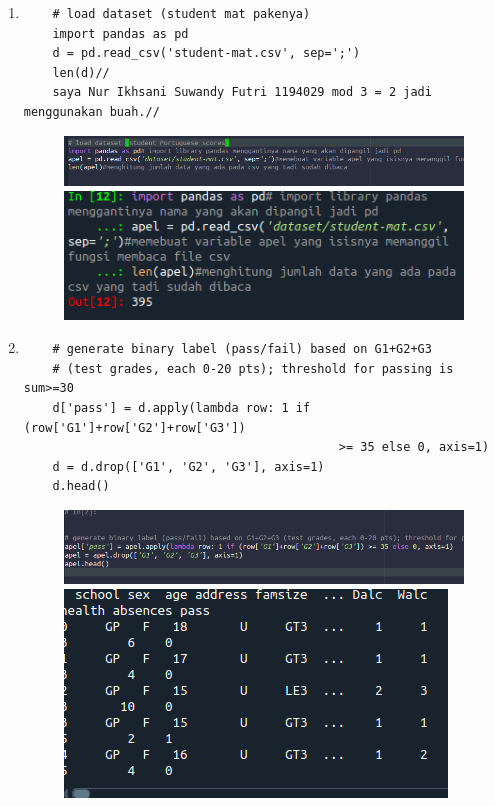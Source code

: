 \begin{enumerate}

\item
\begin{verbatim}
	# load dataset (student mat pakenya)
	import pandas as pd
	d = pd.read_csv('student-mat.csv', sep=';')
	len(d)//
	saya Nur Ikhsani Suwandy Futri 1194029 mod 3 = 2 jadi menggunakan buah.//
\end{verbatim}
\begin{figure}[!htbp]
		\centering
		\includegraphics[scale=0.4]{figures/chapter2/chapter1.1.PNG}
		\includegraphics[scale=0.5]{figures/chapter2/hasilchapter1.1.PNG}
	\end{figure}
\newpage
\item
\begin{verbatim}
	# generate binary label (pass/fail) based on G1+G2+G3 
	# (test grades, each 0-20 pts); threshold for passing is sum>=30
	d['pass'] = d.apply(lambda row: 1 if (row['G1']+row['G2']+row['G3']) 
											>= 35 else 0, axis=1)
	d = d.drop(['G1', 'G2', 'G3'], axis=1)
	d.head()
\end{verbatim}
\begin{figure}[!htbp]
		\centering
		\includegraphics[scale=0.4]{figures/chapter2/chapter1.2.PNG}
		\includegraphics[scale=0.5]{figures/chapter2/hasilchapter1.2.PNG}

\end{figure}
\end{enumerate}

